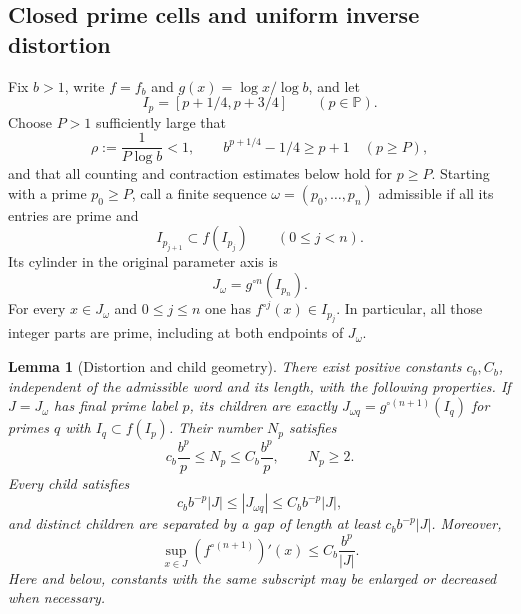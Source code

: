 \documentclass[11pt,a4paper]{article}
\newtheorem{lemma}[theorem]{Lemma}
\theoremstyle{definition}
\theoremstyle{remark}
\numberwithin{equation}{section}
\begin{document}
\subsection{Closed prime cells and uniform inverse distortion}
Fix $b>1$, write $f=f_b$ and $g(x)=\log x/\log b$, and let
\[
 I_p=[p+1/4,p+3/4]\qquad(p\in\mathbb P).
\]
Choose $P>1$ sufficiently large that
\[
 \rho:=\frac1{P\log b}<1,
 \qquad b^{p+1/4}-1/4\ge p+1\quad(p\ge P),
\]
and that all counting and contraction estimates below hold for $p\ge P$. Starting with a prime $p_0\ge P$, call a finite sequence
$\omega=(p_0,\ldots,p_n)$ admissible if all its entries are prime and
\[
 I_{p_{j+1}}\subset f(I_{p_j})\qquad(0\le j<n).
\]
Its cylinder in the original parameter axis is
\[
 J_\omega=g^{\circ n}(I_{p_n}).
\]
For every $x\in J_\omega$ and $0\le j\le n$ one has
$f^{\circ j}(x)\in I_{p_j}$. In particular, all those integer parts
are prime, including at both endpoints of $J_\omega$.
\begin{lemma}[Distortion and child geometry]
\label{fol:lem:wright-distortion}
There exist positive constants $c_b,C_b$, independent of the admissible word and its length, with the following properties. If
$J=J_\omega$ has final prime label $p$, its children are exactly
$J_{\omega q}=g^{\circ(n+1)}(I_q)$ for primes $q$ with
$I_q\subset f(I_p)$. Their number $N_p$ satisfies
\begin{equation}\label{fol:eq:wright-branch-count}
 c_b\frac{b^p}{p}\le N_p\le C_b\frac{b^p}{p},
 \qquad N_p\ge2.
\end{equation}
Every child satisfies
\begin{equation}\label{fol:eq:wright-child-length}
 c_b b^{-p}|J|\le |J_{\omega q}|\le C_b b^{-p}|J|,
\end{equation}
and distinct children are separated by a gap of length at least
$c_b b^{-p}|J|$. Moreover,
\begin{equation}\label{fol:eq:wright-forward-derivative}
 \sup_{x\in J}(f^{\circ(n+1)})'(x)
 \le C_b\frac{b^p}{|J|}.
\end{equation}
Here and below, constants with the same subscript may be enlarged or decreased when necessary.
\end{lemma}
\end{document}
